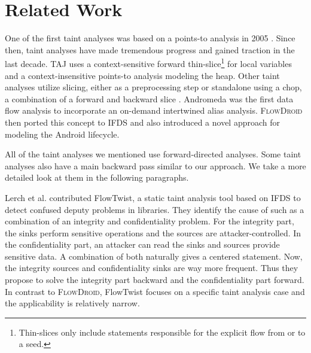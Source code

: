 \documentclass[../draft.tex]{subfiles}
\begin{document}
    \chapter{Related Work}\label{c:relatedwork}
    One of the first taint analyses was based on a points-to analysis in 2005 \cite{Livshits2005}. Since then, taint analyses have made tremendous progress and gained traction in the last decade.
    TAJ\cite{Tripp2009} uses a context-sensitive forward thin-slice\footnote{Thin-slices only include statements responsible for the explicit flow from or to a seed.} for local variables and a context-insensitive points-to analysis modeling the heap.
    Other taint analyses utilize slicing, either as a preprocessing step \cite{} or standalone using a chop, a combination of a forward and backward slice \cite{Titze2015}.
    Andromeda\cite{Tripp2013} was the first data flow analysis to incorporate an on-demand intertwined alias analysis.
    \textsc{FlowDroid}\cite{Arzt2014} then ported this concept to IFDS and also introduced a novel approach for modeling the Android lifecycle.

    All of the taint analyses we mentioned use forward-directed analyses.
    Some taint analyses also have a main backward pass similar to our approach. We take a more detailed look at them in the following paragraphs.

    Lerch et al.\cite{Lerch2014} contributed FlowTwist, a static taint analysis tool based on IFDS to detect confused deputy problems\footnotemark{} in libraries.
    They identify the cause of such as a combination of an integrity and confidentiality problem.
    For the integrity part, the sinks perform sensitive operations and the sources are attacker-controlled.
    In the confidentiality part, an attacker can read the sinks and sources provide sensitive data.
    A combination of both naturally gives a centered statement.
    Now, the integrity sources and confidentiality sinks are way more frequent.
    Thus they propose to solve the integrity part backward and the confidentiality part forward.
    In contrast to \textsc{FlowDroid}, FlowTwist focuses on a specific taint analysis case and the applicability is relatively narrow.
\end{document}
